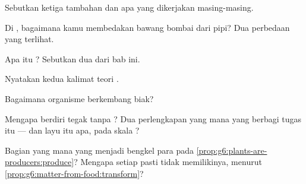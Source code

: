 \begin{exercise}[$\star$]\label{exo:g6:cell-unit-of-life:2}
Sebutkan ketiga tambahan   dan apa yang dikerjakan
masing-masing.
\end{exercise}

\begin{exercise}[$\star$]\label{exo:g6:cell-unit-of-life:3}
Di , bagaimana kamu membedakan   bawang bombai dari
 pipi? Dua perbedaan yang terlihat.
\end{exercise}

\begin{exercise}[$\star$]\label{exo:g6:cell-unit-of-life:4}
Apa itu  ? Sebutkan dua dari bab ini.
\end{exercise}

\begin{exercise}[$\star$]\label{exo:g6:cell-unit-of-life:5}
Nyatakan kedua kalimat teori .
\end{exercise}

\begin{exercise}[$\star$]\label{exo:g6:cell-unit-of-life:6}
Bagaimana organisme  berkembang biak?
\end{exercise}

\begin{exercise}[$\star\star$]\label{exo:g6:cell-unit-of-life:7}
Mengapa  berdiri tegak tanpa ? Dua perlengkapan 
 yang mana yang berbagi tugas itu --- dan layu itu apa, pada
skala ?
\end{exercise}

\begin{exercise}[$\star\star$]\label{exo:g6:cell-unit-of-life:8}
Bagian  yang mana yang menjadi bengkel para  pada
\cref{prop:g6:plants-are-producers:produce}? Mengapa setiap  
pasti tidak memilikinya, menurut
\cref{prop:g6:matter-from-food:transform}?
\end{exercise}

